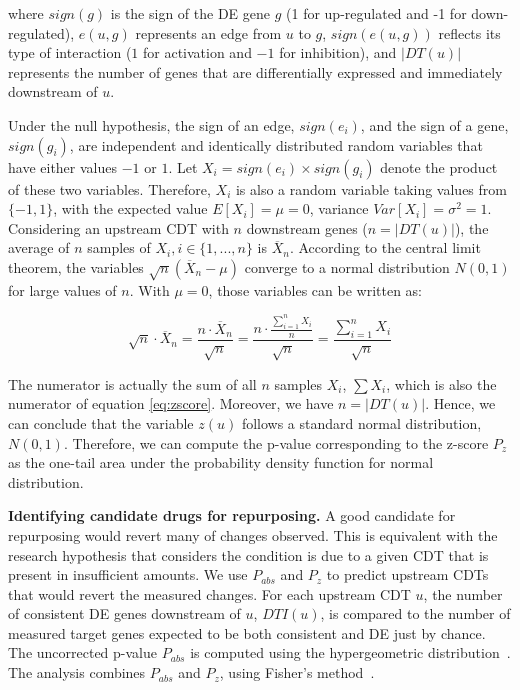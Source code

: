 \documentclass[Minh_PhD_thesis.tex]{subfiles}
\begin{document}
where $sign(g)$ is the sign of the DE gene $g$ (1 for up-regulated and -1 for down-regulated), $e(u,g)$ represents an edge from $u$ to $g$,  $sign(e(u,g))$ reflects its type of interaction ($1$ for activation and $-1$ for inhibition), and $|DT(u)|$ represents the number of genes that are differentially expressed and immediately downstream of $u$. 


Under the null hypothesis, the sign of an edge, $sign(e_i)$, and the sign of a gene, $sign(g_i)$, are independent and identically distributed random variables that have either values $-1$ or $1$.  Let $X_i = sign(e_i) \times sign(g_i)$ denote the product of these two variables. Therefore, $X_i$ is also a random variable taking values from $\{-1,1\}$, with the expected value $E[X_i] = \mu = 0$, variance $Var[X_i] = \sigma^2 = 1$. Considering an upstream CDT with $n$ downstream genes ($n = |DT(u)|$), the  average of $n$ samples of $X_i, i \in \{1,...,n\}$ is $\overline{X}_n$.  According to the central limit theorem, the variables $\sqrt{n}(\overline{X}_n - \mu)$ converge  to a normal distribution $N(0,1)$ for large values of $n$. With $\mu = 0$, those variables can be written as:

\begin{equation}
\sqrt{n} \cdot \overline{X}_n = \frac{n \cdot \overline{X}_n} {\sqrt{n}} = \frac{n \cdot \frac{\sum_{i=1}^n X_i}{n}}{\sqrt{n}} = \frac{\sum_{i=1}^n X_i}{\sqrt{n}}
\end{equation}

The numerator is actually the sum of all $n$ samples $X_i$, $\sum{X_i}$, which is also the numerator of equation \ref{eq:zscore}. 
Moreover, we have $n = |DT(u)|$.
Hence, we can conclude that the variable $z(u)$ follows a standard normal distribution, $N(0,1)$. Therefore, we can compute the p-value corresponding to the z-score $P_z$ as the one-tail area under the probability density function for normal distribution.

\textbf{Identifying candidate drugs for repurposing.}
A good candidate for repurposing would revert many of changes observed. This is equivalent  with the research hypothesis that considers the condition is due to a given CDT that is present in insufficient amounts.
We use $P_{abs}$ and $P_z$ to predict upstream CDTs that would revert the measured changes. 
For each upstream CDT $u$, the number of consistent DE genes downstream of $u$, $DTI(u)$, is compared to the number of measured target genes expected to be both consistent and DE just by chance. The uncorrected p-value $P_{abs}$ is computed using the hypergeometric distribution~\cite{DraghiciOT:2003, DraghiciBook:2011}. The analysis combines $P_{abs}$ and $P_z$, using  Fisher's method~\cite{fisher1925statistical}. %
\end{document}
